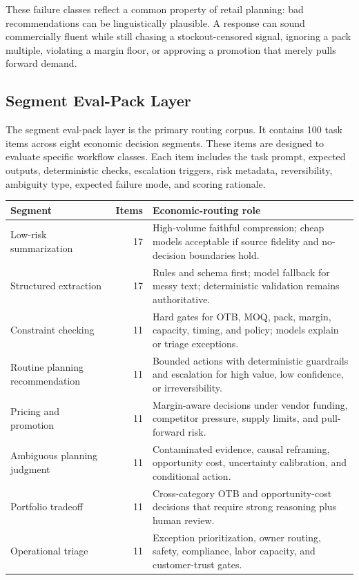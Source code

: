 \documentclass[11pt]{article}
\begin{document}
These failure classes reflect a common property of retail planning: bad recommendations can be linguistically plausible. A response can sound commercially fluent while still chasing a stockout-censored signal, ignoring a pack multiple, violating a margin floor, or approving a promotion that merely pulls forward demand.

\subsection{Segment Eval-Pack Layer}

The segment eval-pack layer is the primary routing corpus. It contains 100 task items across eight economic decision segments. These items are designed to evaluate specific workflow classes. Each item includes the task prompt, expected outputs, deterministic checks, escalation triggers, risk metadata, reversibility, ambiguity type, expected failure mode, and scoring rationale.

\begin{center}
\begin{tabularx}{\textwidth}{>{\raggedright\arraybackslash}p{} r X}
\toprule
Segment & Items & Economic-routing role \\
\midrule
Low-risk summarization & 17 & High-volume faithful compression; cheap models acceptable if source fidelity and no-decision boundaries hold. \\
Structured extraction & 17 & Rules and schema first; model fallback for messy text; deterministic validation remains authoritative. \\
Constraint checking & 11 & Hard gates for OTB, MOQ, pack, margin, capacity, timing, and policy; models explain or triage exceptions. \\
Routine planning recommendation & 11 & Bounded actions with deterministic guardrails and escalation for high value, low confidence, or irreversibility. \\
Pricing and promotion & 11 & Margin-aware decisions under vendor funding, competitor pressure, supply limits, and pull-forward risk. \\
Ambiguous planning judgment & 11 & Contaminated evidence, causal reframing, opportunity cost, uncertainty calibration, and conditional action. \\
Portfolio tradeoff & 11 & Cross-category OTB and opportunity-cost decisions that require strong reasoning plus human review. \\
Operational triage & 11 & Exception prioritization, owner routing, safety, compliance, labor capacity, and customer-trust gates. \\
\bottomrule
\end{tabularx}
\end{center}
\end{document}
